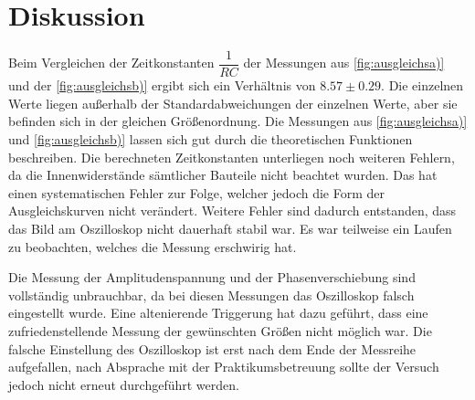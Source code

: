 \section{Diskussion}
\label{sec:Diskussion}


Beim Vergleichen der Zeitkonstanten $ \dfrac{1}{RC}$ der Messungen aus \autoref{fig:ausgleichsa)} und der \autoref{fig:ausgleichsb)} ergibt sich ein Verhältnis von  $8.57 \pm 0.29$. 
Die einzelnen Werte liegen außerhalb der Standardabweichungen der einzelnen Werte, aber sie befinden sich in der gleichen Größenordnung.
Die Messungen aus \autoref{fig:ausgleichsa)} und \autoref{fig:ausgleichsb)} lassen sich gut durch die theoretischen Funktionen beschreiben.
Die berechneten Zeitkonstanten unterliegen noch weiteren Fehlern, da die Innenwiderstände sämtlicher Bauteile nicht beachtet wurden. 
Das hat einen systematischen Fehler zur Folge, welcher jedoch die Form der Ausgleichskurven nicht verändert.
Weitere Fehler sind dadurch entstanden, dass das Bild am Oszilloskop nicht dauerhaft stabil war. Es war teilweise ein Laufen zu beobachten, welches die Messung erschwirig hat. 

Die Messung der Amplitudenspannung und der Phasenverschiebung sind vollständig unbrauchbar, da bei diesen Messungen das Oszilloskop falsch eingestellt wurde. 
Eine altenierende Triggerung hat dazu geführt, dass eine zufriedenstellende Messung der gewünschten Größen nicht möglich war.
Die falsche Einstellung des Oszilloskop ist erst nach dem Ende der Messreihe aufgefallen, nach Absprache mit der Praktikumsbetreuung sollte der Versuch jedoch nicht erneut durchgeführt werden.